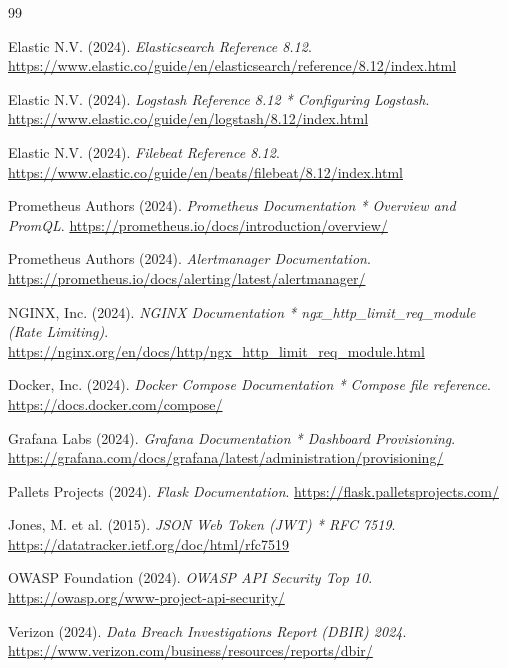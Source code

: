 \documentclass[12pt, a4paper]{report}
\begin{document}
\begin{thebibliography}{99}

Elastic N.V. (2024).
\textit{Elasticsearch Reference 8.12}.
\url{https://www.elastic.co/guide/en/elasticsearch/reference/8.12/index.html}

Elastic N.V. (2024).
\textit{Logstash Reference 8.12 * Configuring Logstash}.
\url{https://www.elastic.co/guide/en/logstash/8.12/index.html}

Elastic N.V. (2024).
\textit{Filebeat Reference 8.12}.
\url{https://www.elastic.co/guide/en/beats/filebeat/8.12/index.html}

Prometheus Authors (2024).
\textit{Prometheus Documentation * Overview and PromQL}.
\url{https://prometheus.io/docs/introduction/overview/}

Prometheus Authors (2024).
\textit{Alertmanager Documentation}.
\url{https://prometheus.io/docs/alerting/latest/alertmanager/}

NGINX, Inc. (2024).
\textit{NGINX Documentation * ngx\_http\_limit\_req\_module (Rate Limiting)}.
\url{https://nginx.org/en/docs/http/ngx_http_limit_req_module.html}

Docker, Inc. (2024).
\textit{Docker Compose Documentation * Compose file reference}.
\url{https://docs.docker.com/compose/}

Grafana Labs (2024).
\textit{Grafana Documentation * Dashboard Provisioning}.
\url{https://grafana.com/docs/grafana/latest/administration/provisioning/}

Pallets Projects (2024).
\textit{Flask Documentation}.
\url{https://flask.palletsprojects.com/}

Jones, M. et al. (2015).
\textit{JSON Web Token (JWT) * RFC 7519}.
\url{https://datatracker.ietf.org/doc/html/rfc7519}

OWASP Foundation (2024).
\textit{OWASP API Security Top 10}.
\url{https://owasp.org/www-project-api-security/}

Verizon (2024).
\textit{Data Breach Investigations Report (DBIR) 2024}.
\url{https://www.verizon.com/business/resources/reports/dbir/}

\end{thebibliography}

\appendix
\end{document}
